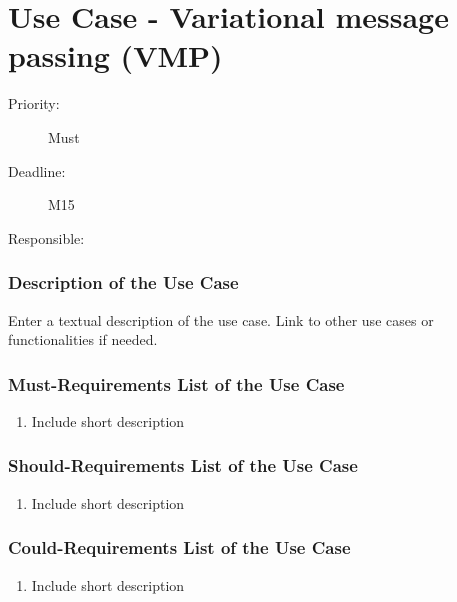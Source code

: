 \newpage
\section{Use Case - Variational message passing (VMP)}
\label{UseCase:VMP}

\begin{description}
\item[Priority:] Must
\item[Deadline:] M15
\item[Responsible:]
\end{description}

\subsubsection*{Description of the Use Case}

Enter a textual description of the use case. Link to other use cases or functionalities if needed. 


\subsubsection*{Must-Requirements List of the Use Case}

\begin{enumerate}
\item Include short description
\end{enumerate}

\subsubsection*{Should-Requirements List of the Use Case}

\begin{enumerate}
\item Include short description
\end{enumerate}

\subsubsection*{Could-Requirements List of the Use Case}

\begin{enumerate}
\item Include short description
\end{enumerate}



